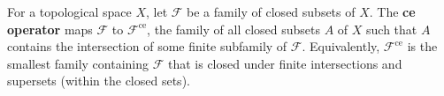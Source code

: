 For a topological space $X$, let $\mathcal{F}$ be a family of closed subsets of $X$. The \textbf{ce operator} maps $\mathcal{F}$ to $\mathcal{F}^{\text{ce}}$, the family of all closed subsets $A$ of $X$ such that $A$ contains the intersection of some finite subfamily of $\mathcal{F}$. Equivalently, $\mathcal{F}^{\text{ce}}$ is the smallest family containing $\mathcal{F}$ that is closed under finite intersections and supersets (within the closed sets).
